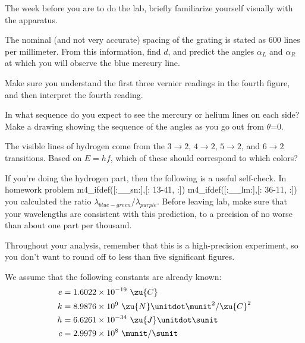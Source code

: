 \prelab

The week before you are to do the lab, briefly familiarize
yourself visually with the apparatus.

\prelabquestion  
The nominal (and not very accurate) spacing of the grating is stated
as 600 lines per millimeter. From this information, find $d$, and
predict the angles $\alpha_L$ and $\alpha_R$ at which you will observe the blue mercury line.


\prelabquestion  Make sure you understand the first three vernier
readings in the fourth figure, and then interpret the fourth reading.

\prelabquestion  In what sequence do you expect to see the mercury or helium lines on
each side? Make a drawing showing the sequence of the angles
as you go out from $\theta $=0.

\prelabquestion
The visible lines of hydrogen come from the $3\rightarrow2$,
$4\rightarrow2$, $5\rightarrow2$, and $6\rightarrow2$
transitions. Based on $E=hf$, which of these should
correspond to which colors?

\prelabquestion

\selfcheck

If you're doing the hydrogen part, then the following is a useful self-check. In homework problem
m4_ifdef([:__sn:],[:%
13-41,%
:])%
m4_ifdef([:__lm:],[:%
36-11,%
:])%
you calculated the ratio $\lambda_{blue-green}/\lambda_{purple}$.
Before leaving lab, make sure that your wavelengths are consistent with this prediction,
to a precision of no worse than about one part per thousand.

\analysis

Throughout your analysis, remember that this is a high-precision
experiment, so you don't want to round off to less than five
significant figures.

We assume
that the following constants are already known:
\begin{align*}
  e	&= 1.6022\times10^{-19}\ \zu{C}\\
  k	&= 8.9876\times10^9\ \zu{N}\unitdot\munit^2/\zu{C}^2 \\
  h	&= 6.6261\times10^{-34}\ \zu{J}\unitdot\sunit \\
  c     &= 2.9979\times10^8\ \munit/\sunit
\end{align*}

